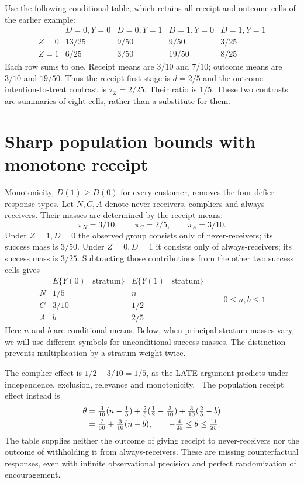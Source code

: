 Use the following conditional table, which retains all receipt and outcome
cells of the earlier example:
\[
\begin{array}{c|rrrr}
 &D=0,Y=0&D=0,Y=1&D=1,Y=0&D=1,Y=1\\ \hline
 Z=0&13/25&9/50&9/50&3/25\\
 Z=1&6/25&3/50&19/50&8/25
\end{array}
\]
Each row sums to one. Receipt means are $3/10$ and $7/10$; outcome
means are $3/10$ and $19/50$. Thus the receipt first stage is
$d=2/5$ and the outcome intention-to-treat contrast is
$\tau_Z=2/25$. Their ratio is $1/5$. These two contrasts are summaries
of eight cells, rather than a substitute for them.

\section{Sharp population bounds with monotone receipt}
\label{exec17:s3-monotone-polytope}

Monotonicity, $D(1)\geq D(0)$ for every customer, removes the four
defier response types. Let $N,C,A$ denote never-receivers, compliers and
always-receivers. Their masses are determined by the receipt means:
\[
 \pi_N=3/10,\qquad \pi_C=2/5,\qquad \pi_A=3/10.
\]
Under $Z=1,D=0$ the observed group consists only of never-receivers;
its success mass is $3/50$. Under $Z=0,D=1$ it consists only of
always-receivers; its success mass is $3/25$. Subtracting those
contributions from the other two success cells gives
\[
\begin{array}{c|cc}
 &E\{Y(0)\mid\text{stratum}\}&E\{Y(1)\mid\text{stratum}\}\\ \hline
 N&1/5&n\\
 C&3/10&1/2\\
 A&b&2/5
\end{array}
\qquad 0\leq n,b\leq1 .
\]
Here $n$ and $b$ are conditional means. Below, when principal-stratum
masses vary, we will use different symbols for unconditional success
masses. The distinction prevents multiplication by a stratum weight twice.

The complier effect is $1/2-3/10=1/5$, as the LATE argument predicts
under independence, exclusion, relevance and
monotonicity.~\citep{angrist1996}
The population receipt effect instead is
\begin{align}
 \theta
 &=\tfrac{3}{10}(n-\tfrac15)
   +\tfrac25(\tfrac12-\tfrac3{10})
   +\tfrac3{10}(\tfrac25-b) \notag\\
 &=\tfrac7{50}+\tfrac3{10}(n-b),
 \qquad
 -\tfrac4{25}\leq\theta\leq\tfrac{11}{25}.
 \label{exec17:s3-monotone-ate}
\end{align}
The table supplies neither the outcome of giving receipt to never-receivers
nor the outcome of withholding it from always-receivers.
These are missing counterfactual responses, even with infinite observational
precision and perfect randomization of encouragement.

